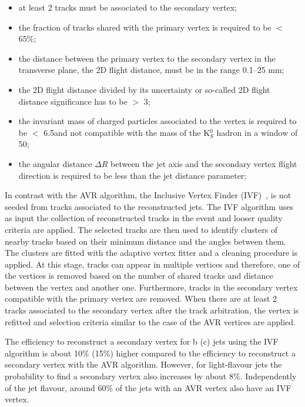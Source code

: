 \begin{itemize}
\item at least 2 tracks must be associated to the secondary vertex;
\item the fraction of tracks shared with the primary vertex is required to be $<$ 65\%;
\item the distance between the primary vertex to the secondary vertex in the transverse plane, the 2D flight distance, must be in the range 0.1--25 mm;
\item the 2D flight distance divided by its uncertainty or so-called 2D flight distance significance has to be $>$ 3;
\item the invariant mass of charged particles associated to the vertex is required to be $<$ 6.5\GeV and not compatible with the mass of the K$^0_S$ hadron in a window of 50\MeV;
\item the angular distance $\Delta R$ between the jet axis and the secondary vertex flight direction is required to be less than the jet distance parameter;
\end{itemize}

In contrast with the AVR algorithm, the Inclusive Vertex Finder (IVF)~\cite{Khachatryan:2011wq}, is not seeded from tracks associated to the reconstructed jets. The IVF algorithm uses as input the collection of reconstructed tracks in the event and looser quality criteria are applied. The selected tracks are then used to identify clusters of nearby tracks based on their minimum distance and the angles between them. The clusters are fitted with the adaptive vertex fitter and a cleaning procedure is applied. At this stage, tracks can appear in multiple vertices and therefore, one of the vertices is removed based on the number of shared tracks and distance between the vertex and another one. Furthermore, tracks in the secondary vertex compatible with the primary vertex are removed. When there are at least 2 tracks associated to the secondary vertex after the track arbitration, the vertex is refitted and selection criteria similar to the case of the AVR vertices are applied.

 The efficiency to reconstruct a secondary vertex for b (c) jets using the IVF algorithm is about 10\% (15\%) higher compared to the efficiency to reconstruct a secondary vertex with the AVR algorithm. However, for light-flavour jets the probability to find a secondary vertex also increases by about 8\%. Independently of the jet flavour, around 60\% of the jets with an AVR vertex also have an IVF vertex.
 

